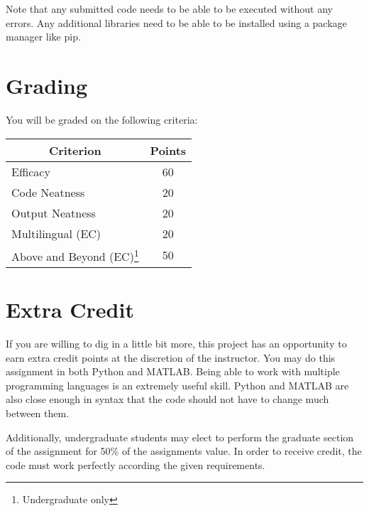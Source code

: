 \documentclass[
	letterpaper, %
	fontsize=10pt, %
	twoside=true, %
	numbers=noenddot, %
]{kaobook}
\begin{document}

Note that any submitted code needs to be able to be executed without any errors. Any additional libraries need to be able to be installed using a package manager like pip.


\section*{Grading}
You will be graded on the following criteria:

\begin{table}[h!]
    \begin{tabular}{l | c}
        \toprule
        \multicolumn{1}{c|}{\textbf{Criterion}} & \textbf{Points} \\
        \midrule
        Efficacy & 60 \\
        Code Neatness & 20 \\
        Output Neatness & 20 \\
        Multilingual (EC) & 20 \\
        Above and Beyond (EC)\footnote{Undergraduate only} & 50 \\
        \bottomrule
    \end{tabular}
\end{table}

\section*{Extra Credit}
If you are willing to dig in a little bit more, this project has an opportunity to earn extra credit points at the discretion of the instructor.
You may do this assignment in both Python and MATLAB. 
Being able to work with multiple programming languages is an extremely useful skill.
Python and MATLAB are also close enough in syntax that the code should not have to change much between them.

Additionally, undergraduate students may elect to perform the graduate section of the assignment for 50\% of the assignments value.
In order to receive credit, the code must work perfectly according the given requirements.
\end{document}
